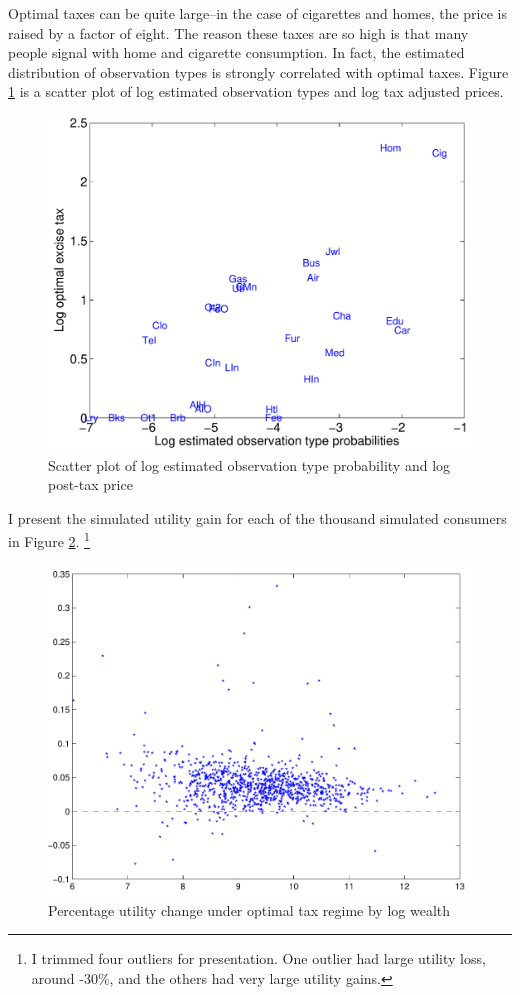 \documentclass{article}
\begin{document}
Optimal taxes can be quite large--in the case of cigarettes and homes, the price is raised by a factor of eight.
The reason these taxes are so high is that many people signal with home and cigarette consumption.
In fact, the estimated distribution of observation types is strongly correlated with optimal taxes.
Figure \ref{fig:tvscat} is a scatter plot of log estimated observation types and log tax adjusted prices.
\begin{figure}
	\begin{center}
		\includegraphics[scale=.8]{pics/tvscat_cropped.pdf}
	\end{center}
	\caption{Scatter plot of log estimated observation type probability and log post-tax price}
	\label{fig:tvscat}
\end{figure}
I present the simulated utility gain for each of the thousand simulated consumers in Figure \ref{fig:taxscat}.
\footnote{I trimmed four outliers for presentation.
One outlier had large utility loss, around -30\%, and the others had very large utility gains.}
\begin{figure}
	\begin{center}
		\includegraphics[scale=.8]{pics/taxscat_cropped.pdf}
	\end{center}
	\caption{Percentage utility change under optimal tax regime by log wealth}
	\label{fig:taxscat}
\end{figure}
\end{document}
